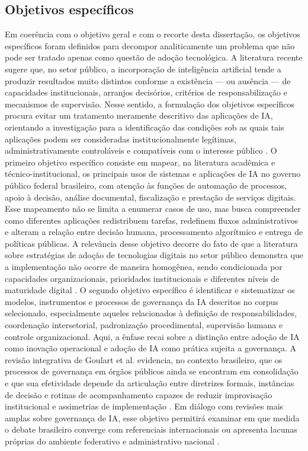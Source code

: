 \documentclass[12pt,a4paper]{article}
\begin{document}
\subsection{Objetivos específicos}
\label{sec:org8ce9952}
Em coerência com o objetivo geral e com o recorte desta dissertação, os objetivos específicos foram definidos para decompor analiticamente um problema que não pode ser tratado apenas como questão de adoção tecnológica. A literatura recente sugere que, no setor público, a incorporação de inteligência artificial tende a produzir resultados muito distintos conforme a existência — ou ausência — de capacidades institucionais, arranjos decisórios, critérios de responsabilização e mecanismos de supervisão. Nesse sentido, a formulação dos objetivos específicos procura evitar um tratamento meramente descritivo das aplicações de IA, orientando a investigação para a identificação das condições sob as quais tais aplicações podem ser consideradas institucionalmente legítimas, administrativamente controláveis e compatíveis com o interesse público \autocite{madan2022ai} \autocite{criado2024artificial} \autocite{david2023understanding}.
O primeiro objetivo específico consiste em mapear, na literatura acadêmica e técnico-institucional, os principais usos de sistemas e aplicações de IA no governo público federal brasileiro, com atenção às funções de automação de processos, apoio à decisão, análise documental, fiscalização e prestação de serviços digitais. Esse mapeamento não se limita a enumerar casos de uso, mas busca compreender como diferentes aplicações redistribuem tarefas, redefinem fluxos administrativos e alteram a relação entre decisão humana, processamento algorítmico e entrega de políticas públicas. A relevância desse objetivo decorre do fato de que a literatura sobre estratégias de adoção de tecnologias digitais no setor público demonstra que a implementação não ocorre de maneira homogênea, sendo condicionada por capacidades organizacionais, prioridades institucionais e diferentes níveis de maturidade digital \autocite{david2023understanding} \autocite{alhosani2024opportunities}.
O segundo objetivo específico é identificar e sistematizar os modelos, instrumentos e processos de governança da IA descritos no corpus selecionado, especialmente aqueles relacionados à definição de responsabilidades, coordenação intersetorial, padronização procedimental, supervisão humana e controle organizacional. Aqui, a ênfase recai sobre a distinção entre adoção de IA como inovação operacional e adoção de IA como prática sujeita a governança. A revisão integrativa de Goulart et al. evidencia, no contexto brasileiro, que os processos de governança em órgãos públicos ainda se encontram em consolidação e que sua efetividade depende da articulação entre diretrizes formais, instâncias de decisão e rotinas de acompanhamento capazes de reduzir improvisação institucional e assimetrias de implementação \autocite{goulart2025processos}. Em diálogo com revisões mais amplas sobre governança de IA, esse objetivo permitirá examinar em que medida o debate brasileiro converge com referenciais internacionais ou apresenta lacunas próprias do ambiente federativo e administrativo nacional \autocite{batool2025ai} \autocite{sigfrids2022how}.
\end{document}
